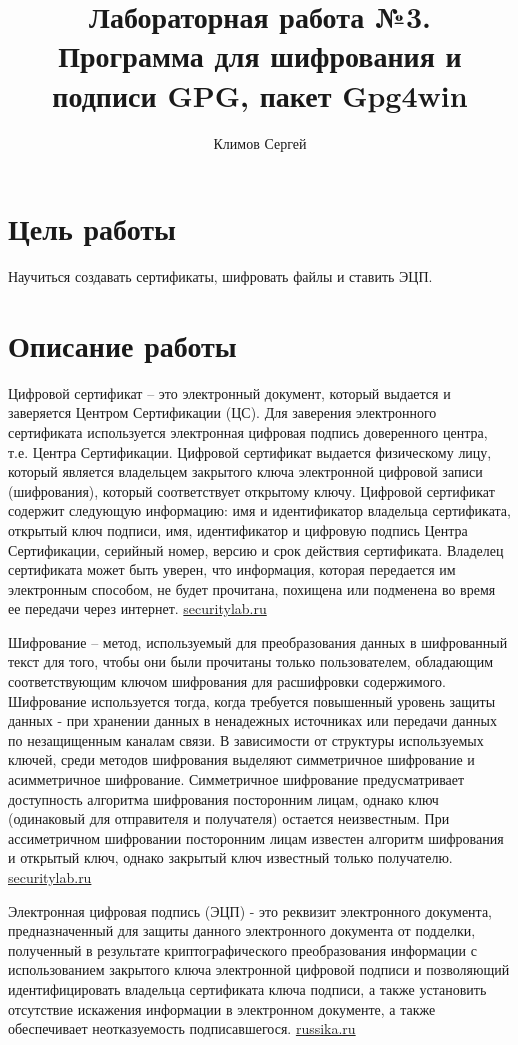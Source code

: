 \documentclass[10pt,a4paper]{report}
\author{Климов Сергей}
\title{Лабораторная работа №3.\\
	Программа для шифрования и подписи GPG, пакет Gpg4win}
\begin{document}
\maketitle
\tableofcontents
\pagebreak

\section{Цель работы}
Научиться создавать сертификаты, шифровать файлы и ставить ЭЦП.
\section{Описание работы}
Цифровой сертификат – это электронный документ, который выдается и заверяется Центром Сертификации (ЦС). Для заверения электронного сертификата используется электронная цифровая подпись доверенного центра, т.е. Центра Сертификации.  Цифровой сертификат выдается физическому лицу, который является владельцем закрытого ключа электронной цифровой записи (шифрования), который соответствует открытому ключу.
Цифровой сертификат содержит следующую информацию: имя и идентификатор владельца сертификата, открытый ключ подписи, имя, идентификатор и цифровую подпись Центра Сертификации, серийный номер, версию и срок действия сертификата.
Владелец сертификата может быть уверен, что информация, которая передается им электронным способом, не будет прочитана, похищена или подменена во время ее передачи через интернет.
\href {goo.gl/W4FzmI}{securitylab.ru}

Шифрование – метод, используемый для преобразования данных в шифрованный текст для того, чтобы они были прочитаны только пользователем, обладающим соответствующим ключом шифрования для расшифровки содержимого. Шифрование используется тогда, когда требуется повышенный уровень защиты данных - при хранении данных в ненадежных источниках или передачи данных по незащищенным каналам связи.
В зависимости от структуры используемых ключей, среди методов шифрования выделяют симметричное шифрование и асимметричное шифрование. Симметричное шифрование предусматривает доступность алгоритма шифрования посторонним лицам, однако ключ (одинаковый для отправителя и получателя) остается неизвестным. При ассиметричном шифровании посторонним лицам известен алгоритм шифрования и открытый ключ, однако закрытый ключ известный только получателю.
\href {goo.gl/BBLQN1}{securitylab.ru}

Электронная цифровая подпись (ЭЦП) - это реквизит электронного документа, предназначенный для защиты данного электронного документа от подделки, полученный в результате криптографического преобразования информации с использованием закрытого ключа электронной цифровой подписи и позволяющий идентифицировать владельца сертификата ключа подписи, а также установить отсутствие искажения информации в электронном документе, а также обеспечивает неотказуемость подписавшегося. 
\href {goo.gl/2nEYGZ}{russika.ru}
\end{document}
